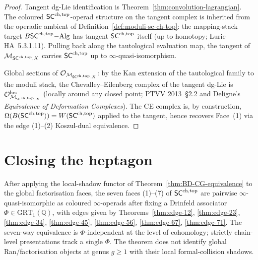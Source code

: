 \begin{proof}
Tangent dg-Lie identification is
Theorem~\ref{thm:convolution-lagrangian}. The coloured $\mathsf{SC}^{\mathrm{ch},\mathrm{top}}$-operad
structure on the tangent complex is inherited from the operadic
ambient of Definition~\ref{def:moduli-sc-ch-top}: the mapping-stack
target $B\mathsf{SC}^{\mathrm{ch},\mathrm{top}}\mathrm{-Alg}$ has tangent $\mathsf{SC}^{\mathrm{ch},\mathrm{top}}$ itself (up to
homotopy; Lurie HA~5.3.1.11). Pulling back along the tautological
evaluation map, the tangent of $\mathcal{M}_{\mathsf{SC}^{\mathrm{ch},\mathrm{top}},X}$ carries
$\mathsf{SC}^{\mathrm{ch},\mathrm{top}}$ up to $\infty$-quasi-isomorphism.

Global sections of $\mathcal{O}_{\mathcal{M}_{\mathsf{SC}^{\mathrm{ch},\mathrm{top}},X}}$: by the
Kan extension of the tautological family to the moduli stack,
the Chevalley--Eilenberg complex of the tangent dg-Lie is
$\mathcal{O}^{\mathrm{loc}}_{\mathcal{M}_{\mathsf{SC}^{\mathrm{ch},\mathrm{top}},X}}$ (locally
around any closed point; PTVV 2013~\S2.2 and Deligne's
\textit{Equivalence of Deformation Complexes}). The
CE complex is, by construction, $\Omega(B(\mathsf{SC}^{\mathrm{ch},\mathrm{top}}))=W(\mathsf{SC}^{\mathrm{ch},\mathrm{top}})$
applied to the tangent, hence recovers Face~(1) via the edge
(1)--(2) Koszul-dual equivalence.
\end{proof}

\section{Closing the heptagon}
\label{sec:heptagon-closed}

\begin{theorem}
\label{thm:heptagon-closed}%
After applying the local-shadow functor of
Theorem~\ref{thm:BD-CG-equivalence} to the global factorisation
faces, the seven faces (1)--(7) of $\mathsf{SC}^{\mathrm{ch},\mathrm{top}}$ are pairwise
$\infty$-quasi-isomorphic as coloured $\infty$-operads after fixing a
Drinfeld associator $\Phi\in\mathrm{GRT}_1(\mathbb{Q})$, with edges
given by Theorems~\ref{thm:edge-12}, \ref{thm:edge-23},
\ref{thm:edge-34}, \ref{thm:edge-45}, \ref{thm:edge-56},
\ref{thm:edge-67}, \ref{thm:edge-71}. The seven-way equivalence is
$\Phi$-independent at the level of cohomology; strictly chain-level
presentations track a single $\Phi$. The theorem does not identify
global Ran/factorisation objects at genus $g\geq 1$ with their local
formal-collision shadows.
\end{theorem}

